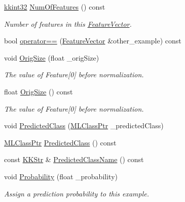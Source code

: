 \begin{DoxyCompactItemize}
\hyperlink{namespace_k_k_b_a8fa4952cc84fda1de4bec1fbdd8d5b1b}{kkint32} \hyperlink{class_k_k_m_l_l_1_1_feature_vector_a660d9573e5ac78e9c3e09d68cddae7d6}{Num\+Of\+Features} () const 
\begin{DoxyCompactList}\small\item\em Number of features in this \hyperlink{class_k_k_m_l_l_1_1_feature_vector}{Feature\+Vector}. \end{DoxyCompactList}\item 
bool \hyperlink{class_k_k_m_l_l_1_1_feature_vector_ac234541065501f9f668683705ae58176}{operator==} (\hyperlink{class_k_k_m_l_l_1_1_feature_vector}{Feature\+Vector} \&other\+\_\+example) const 
\item 
void \hyperlink{class_k_k_m_l_l_1_1_feature_vector_a5ea23a16266bc34a289824042a836c06}{Orig\+Size} (float \+\_\+orig\+Size)
\begin{DoxyCompactList}\small\item\em The value of Feature\mbox{[}0\mbox{]} before normalization. \end{DoxyCompactList}\item 
float \hyperlink{class_k_k_m_l_l_1_1_feature_vector_a0ff6302de280420b678e6e098c7b88f1}{Orig\+Size} () const 
\begin{DoxyCompactList}\small\item\em The value of Feature\mbox{[}0\mbox{]} before normalization. \end{DoxyCompactList}\item 
void \hyperlink{class_k_k_m_l_l_1_1_feature_vector_a3ec4b39405a2904c966a505c391cff33}{Predicted\+Class} (\hyperlink{namespace_k_k_m_l_l_ac272393853d59e72e8456f14cd6d8c23}{M\+L\+Class\+Ptr} \+\_\+predicted\+Class)
\item 
\hyperlink{namespace_k_k_m_l_l_ac272393853d59e72e8456f14cd6d8c23}{M\+L\+Class\+Ptr} \hyperlink{class_k_k_m_l_l_1_1_feature_vector_aa7bd4463fa868b373d49b263185d209d}{Predicted\+Class} () const 
\item 
const \hyperlink{class_k_k_b_1_1_k_k_str}{K\+K\+Str} \& \hyperlink{class_k_k_m_l_l_1_1_feature_vector_ae5abb508dc795f933f04c7eaca9e2c20}{Predicted\+Class\+Name} () const 
\item 
void \hyperlink{class_k_k_m_l_l_1_1_feature_vector_ad999f89e685b334967fa114d2e827507}{Probability} (float \+\_\+probability)
\begin{DoxyCompactList}\small\item\em Assign a prediction probability to this example. \end{DoxyCompactList}\item 

\end{DoxyCompactItemize}
